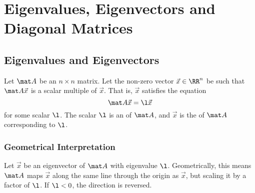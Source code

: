 \chapter{Eigenvalues, Eigenvectors and Diagonal Matrices}

\section{Eigenvalues and Eigenvectors}

\begin{definition}
    Let $\mat A$ be an $n \times n$ matrix. Let the non-zero vector $\vec x \in \RR^n$ be such that $\mat A \vec x$ is a scalar multiple of $\vec x$. That is, $\vec x$ satisfies the equation \[\mat A \vec x = \l \vec x\] for some scalar $\l$. The scalar $\l$ is an  of $\mat A$, and $\vec x$ is the  of $\mat A$ corresponding to $\l$.
\end{definition}

\subsection{Geometrical Interpretation}

Let $\vec x$ be an eigenvector of $\mat A$ with eigenvalue $\l$. Geometrically, this means $\mat A$ maps $\vec x$ along the same line through the origin as $\vec x$, but scaling it by a factor of $\l$. If $\l < 0$, the direction is reversed.

